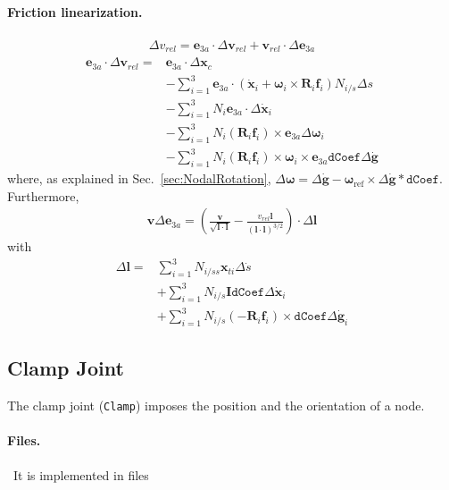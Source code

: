 \documentclass[10pt,fleqn,subeqn]{report}
\newcommand{\T}[1]{\bm{#1}}
\newcommand{\TT}[1]{\bm{#1}}
\begin{document}
\paragraph{Friction linearization.}
\begin{align*}
\Delta v_{rel} = \T{e}_{3a} \cdot \Delta\T{v}_{rel} + \T{v}_{rel}\cdot\Delta\T{e}_{3a}
\end{align*}
\begin{align*}
\T{e}_{3a} \cdot \Delta \T{v}_{rel} = & \T{e}_{3a} \cdot \Delta \T{x}_c\\
& -\sum_{i=1}^3 \T{e}_{3a} \cdot (\dot{\T{x}}_i + \T{\omega}_i\times\TT{R}_i\T{f}_i) N_{i/s}\Delta s\\
& -\sum_{i=1}^3 N_i \T{e}_{3a} \cdot \Delta \dot{\T{x}}_i \\
& -\sum_{i=1}^3 N_i (\TT{R}_i \T{f}_i)\times \T{e}_{3a} \Delta \T{\omega}_i\\
& -\sum_{i=1}^3 N_i (\TT{R}_i\T{f}_i)\times \T{\omega}_i \times \T{e}_{3a} \texttt{dCoef} \Delta \dot{\T{g}}
\end{align*}
where, as explained in Sec.~\ref{sec:NodalRotation}, $\Delta \T \omega = \Delta \dot{\T g}-
\T \omega_{\mathrm{ref}}\times\Delta \dot{\T g} * \texttt{dCoef}$. Furthermore,
\begin{align*}
\T{v}\Delta\T{e}_{3a} =
\left(\frac{\T{v}}{\sqrt{\T{l}\cdot\T{l}}}-\frac{v_{rel}\T{l}}{(\T{l}\cdot\T{l})^{3/2}}\right)
\cdot\Delta\T{l}
\end{align*}
with
\begin{align*}
\Delta\T{l} = &\sum_{i=1}^3 N_{i/ss}\T{x}_{ti}\Delta\dot{s}\\
&+\sum_{i=1}^3N_{i/s}\TT{I}\texttt{dCoef}\Delta\dot{\T{x}}_i\\
&+\sum_{i=1}^3N_{i/s}(-\TT{R}_i\T{f}_i)\times\texttt{dCoef}\Delta\dot{\T{g}}_i
\end{align*}





\subsection{Clamp Joint}
\label{sec:ClampJoint}
The clamp joint (\texttt{Clamp}) imposes the position
and the orientation of a node.

\paragraph{Files.} \
It is implemented in files
\end{document}
